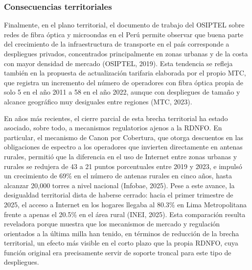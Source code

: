 \subsubsection{Consecuencias territoriales}
Finalmente, en el plano territorial, el documento de trabajo del OSIPTEL sobre redes de fibra óptica y microondas en el Perú permite observar que buena parte del crecimiento de la infraestructura de transporte en el país corresponde a despliegues privados, concentrados principalmente en zonas urbanas y de la costa con mayor densidad de mercado (OSIPTEL, 2019). Esta tendencia se refleja también en la propuesta de actualización tarifaria elaborada por el propio MTC, que registra un incremento del número de operadores con fibra óptica propia de solo 5 en el año 2011 a 58 en el año 2022, aunque con despliegues de tamaño y alcance geográfico muy desiguales entre regiones (MTC, 2023).

En años más recientes, el cierre parcial de esta brecha territorial ha estado asociado, sobre todo, a mecanismos regulatorios ajenos a la RDNFO. En particular, el mecanismo de Canon por Cobertura, que otorga descuentos en las obligaciones de espectro a los operadores que invierten directamente en antenas rurales, permitió que la diferencia en el uso de Internet entre zonas urbanas y rurales se redujera de 43 a 21 puntos porcentuales entre 2019 y 2023, e impulsó un crecimiento de 69\% en el número de antenas rurales en cinco años, hasta alcanzar 20,000 torres a nivel nacional (Infobae, 2025). Pese a este avance, la desigualdad territorial dista de haberse cerrado: hacia el primer trimestre de 2025, el acceso a Internet en los hogares llegaba al 80.3\% en Lima Metropolitana frente a apenas el 20.5\% en el área rural (INEI, 2025). Esta comparación resulta reveladora porque muestra que los mecanismos de mercado y regulación orientados a la última milla han tenido, en términos de reducción de la brecha territorial, un efecto más visible en el corto plazo que la propia RDNFO, cuya función original era precisamente servir de soporte troncal para este tipo de despliegues.

